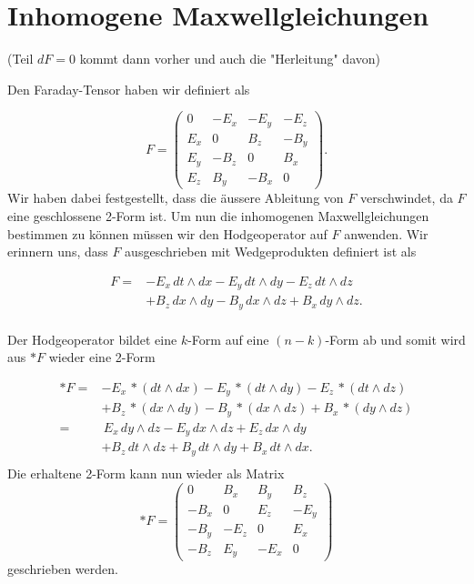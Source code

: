%
%
%
%
\section{Inhomogene Maxwellgleichungen
	\label{maxwell:section:InhomogeneMaxwellgleichungen}}
(Teil $dF = 0$ kommt dann vorher und auch die "Herleitung" davon)

Den Faraday-Tensor haben wir definiert als

\begin{equation}
	F = \begin{pmatrix}
		0 & -E_x & -E_y & -E_z \\ E_x & 0 & B_z & -B_y \\ E_y & -B_z & 0 & B_x \\ E_z & B_y & -B_x & 0 
	\end{pmatrix}.
\end{equation}
Wir haben dabei festgestellt, dass die äussere Ableitung von $F$ verschwindet, da $F$ eine geschlossene 2-Form ist.
Um nun die inhomogenen Maxwellgleichungen bestimmen zu können müssen wir den Hodgeoperator auf $F$ anwenden.
Wir erinnern uns, dass $F$ ausgeschrieben mit Wedgeprodukten definiert ist als

\begin{align*}
	F = 
	&- E_x \, dt \wedge dx - E_y \, dt \wedge dy - E_z \, dt \wedge dz \\
	&+ B_z \, dx \wedge dy - B_y \, dx \wedge dz + B_x \, dy \wedge dz.\\
\end{align*}

Der Hodgeoperator bildet eine $k$-Form auf eine $(n-k)$-Form ab und somit wird aus $\ast F$ wieder eine 2-Form

\begin{align*}
	\ast F =
	& - E_{x} \, \ast(dt \wedge dx) - E_{y} \, \ast(dt \wedge dy) - E_{z} \, \ast(dt \wedge dz) \\
	& + B_z \, \ast(dx \wedge dy) - B_y \, \ast(dx \wedge dz) + B_x \, \ast(dy \wedge dz)\\
	= 
	& \, E_{x} \, dy \wedge dz - E_{y} \, dx \wedge dz + E_{z} \, dx \wedge dy \\
	& + B_z \, dt \wedge dz + B_y \, dt \wedge dy + B_x \, dt \wedge dx.\\
\end{align*}
Die erhaltene 2-Form kann nun wieder als Matrix
\begin{equation}
	\ast F = \begin{pmatrix}
		0 & B_x & B_y & B_z \\ -B_x & 0 & E_z & -E_y \\ -B_y & -E_z & 0 & E_x \\ -B_z & E_y & -E_x & 0 
	\end{pmatrix}
\end{equation}
geschrieben werden.

